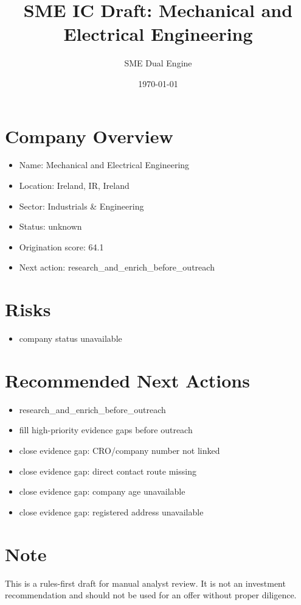 \documentclass[11pt,a4paper]{article}
\title{SME IC Draft: Mechanical and Electrical Engineering}
\author{SME Dual Engine}
\date{\today}
\begin{document}
\maketitle
\section*{Company Overview}
\begin{itemize}[leftmargin=1.4em]
\item Name: Mechanical and Electrical Engineering
\item Location: Ireland, IR, Ireland
\item Sector: Industrials \& Engineering
\item Status: unknown
\item Origination score: 64.1
\item Next action: research\_and\_enrich\_before\_outreach
\end{itemize}
\section*{Risks}
\begin{itemize}[leftmargin=1.4em]
\item company status unavailable
\end{itemize}
\section*{Recommended Next Actions}
\begin{itemize}[leftmargin=1.4em]
\item research\_and\_enrich\_before\_outreach
\item fill high-priority evidence gaps before outreach
\item close evidence gap: CRO/company number not linked
\item close evidence gap: direct contact route missing
\item close evidence gap: company age unavailable
\item close evidence gap: registered address unavailable
\end{itemize}
\section*{Note}
This is a rules-first draft for manual analyst review. It is not an investment
recommendation and should not be used for an offer without proper diligence.
\end{document}
